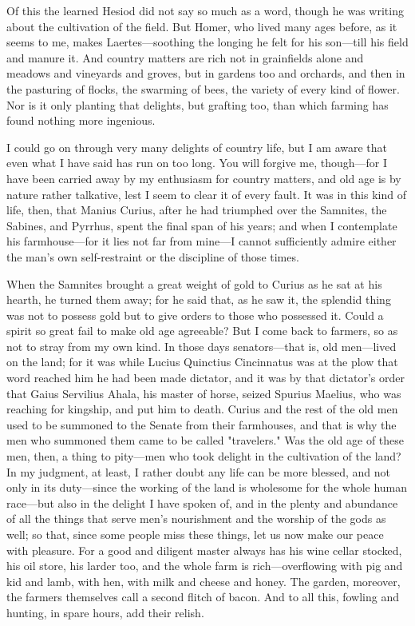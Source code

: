  Of this the learned Hesiod did not say so much as a word, though he was writing about the cultivation of the field. But Homer, who lived many ages before, as it seems to me, makes Laertes—soothing the longing he felt for his son—till his field and manure it. And country matters are rich not in grainfields alone and meadows and vineyards and groves, but in gardens too and orchards, and then in the pasturing of flocks, the swarming of bees, the variety of every kind of flower. Nor is it only planting that delights, but grafting too, than which farming has found nothing more ingenious.

 I could go on through very many delights of country life, but I am aware that even what I have said has run on too long. You will forgive me, though—for I have been carried away by my enthusiasm for country matters, and old age is by nature rather talkative, lest I seem to clear it of every fault. It was in this kind of life, then, that Manius Curius, after he had triumphed over the Samnites, the Sabines, and Pyrrhus, spent the final span of his years; and when I contemplate his farmhouse—for it lies not far from mine—I cannot sufficiently admire either the man's own self-restraint or the discipline of those times.

 When the Samnites brought a great weight of gold to Curius as he sat at his hearth, he turned them away; for he said that, as he saw it, the splendid thing was not to possess gold but to give orders to those who possessed it. Could a spirit so great fail to make old age agreeable? But I come back to farmers, so as not to stray from my own kind. In those days senators—that is, old men—lived on the land; for it was while Lucius Quinctius Cincinnatus was at the plow that word reached him he had been made dictator, and it was by that dictator's order that Gaius Servilius Ahala, his master of horse, seized Spurius Maelius, who was reaching for kingship, and put him to death. Curius and the rest of the old men used to be summoned to the Senate from their farmhouses, and that is why the men who summoned them came to be called "travelers." Was the old age of these men, then, a thing to pity—men who took delight in the cultivation of the land? In my judgment, at least, I rather doubt any life can be more blessed, and not only in its duty—since the working of the land is wholesome for the whole human race—but also in the delight I have spoken of, and in the plenty and abundance of all the things that serve men's nourishment and the worship of the gods as well; so that, since some people miss these things, let us now make our peace with pleasure. For a good and diligent master always has his wine cellar stocked, his oil store, his larder too, and the whole farm is rich—overflowing with pig and kid and lamb, with hen, with milk and cheese and honey. The garden, moreover, the farmers themselves call a second flitch of bacon. And to all this, fowling and hunting, in spare hours, add their relish.

